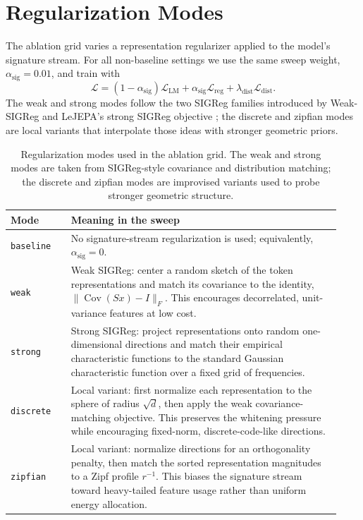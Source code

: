\documentclass{article} %
\begin{document}
\section{Regularization Modes}
\label{appendix:reg_modes}

The ablation grid varies a representation regularizer applied to the model's signature stream.
For all non-baseline settings we use the same sweep weight, $\alpha_{\mathrm{sig}} = 0.01$,
and train with
\begin{equation}
    \mathcal{L} = (1-\alpha_{\mathrm{sig}})\mathcal{L}_{\mathrm{LM}}
    + \alpha_{\mathrm{sig}}\mathcal{L}_{\mathrm{reg}}
    + \lambda_{\mathrm{dist}}\mathcal{L}_{\mathrm{dist}} .
\end{equation}
The weak and strong modes follow the two SIGReg families introduced by Weak-SIGReg
\citep{weak_sigreg2026} and LeJEPA's strong SIGReg objective \citep{lejepa2025}; the
discrete and zipfian modes are local variants that interpolate those ideas with stronger
geometric priors.

\begin{table}[!ht]
\centering
\small
\begin{tabular}{p{0.17\linewidth}p{0.76\linewidth}}
\toprule
\textbf{Mode} & \textbf{Meaning in the sweep} \\
\midrule
\texttt{baseline} & No signature-stream regularization is used; equivalently, $\alpha_{\mathrm{sig}}=0$. \\
\texttt{weak} & Weak SIGReg: center a random sketch of the token representations and match its covariance to the identity, $\lVert \operatorname{Cov}(Sx)-I\rVert_F$. This encourages decorrelated, unit-variance features at low cost. \\
\texttt{strong} & Strong SIGReg: project representations onto random one-dimensional directions and match their empirical characteristic functions to the standard Gaussian characteristic function over a fixed grid of frequencies. \\
\texttt{discrete} & Local variant: first normalize each representation to the sphere of radius $\sqrt{d}$, then apply the weak covariance-matching objective. This preserves the whitening pressure while encouraging fixed-norm, discrete-code-like directions. \\
\texttt{zipfian} & Local variant: normalize directions for an orthogonality penalty, then match the sorted representation magnitudes to a Zipf profile $r^{-1}$. This biases the signature stream toward heavy-tailed feature usage rather than uniform energy allocation. \\
\bottomrule
\end{tabular}
\caption{Regularization modes used in the ablation grid. The weak and strong modes are taken from SIGReg-style covariance and distribution matching; the discrete and zipfian modes are improvised variants used to probe stronger geometric structure.}
\label{table:reg_modes}
\end{table}
\end{document}
